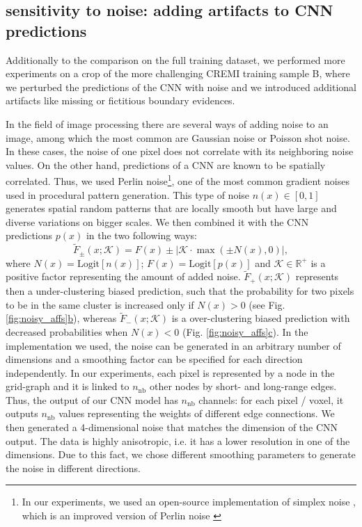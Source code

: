 \subsection{\algname{} sensitivity to noise: adding artifacts to CNN predictions} \label{sec:appendix_noise_gen}
Additionally to the comparison on the full training dataset, we performed more experiments on a crop of the more challenging CREMI training sample B, where we perturbed the predictions of the CNN with noise and we introduced additional artifacts like missing or fictitious boundary evidences.

In the field of image processing there are several ways of adding noise to an image, among which the most common are Gaussian noise or Poisson shot noise. 
In these cases, the noise of one pixel does not correlate with its neighboring noise values. On the other hand, predictions of a CNN are known to be spatially correlated. 
Thus, we used Perlin noise\footnote{In our experiments, we used an open-source implementation of simplex noise \cite{perlin2001noise}, which is an improved version of Perlin noise \cite{perlin1985image}}, one of the most common gradient noises used in procedural pattern generation. This type of noise $n(x)\in[0,1]$ generates spatial random patterns that are locally smooth but have large and diverse variations on bigger scales. We then combined it with the CNN predictions $p(x)$ in the two following ways: 
\begin{equation}\label{eq:noise_biased_predictions}
\tilde{F}_{\pm}(x;\mathcal{K})=F(x)\pm\big|\mathcal{K}\cdot\max\left(\pm N(x),0\right)\big|,
\end{equation}
where  $N(x)=\mathrm{Logit}[n(x)]$; $F(x)=\mathrm{Logit}[p(x)]$ and $\mathcal{K}\in \mathbb{R}^+$ is a positive factor representing the amount of added noise. $\tilde{F}_{+}(x;\mathcal{K})$ represents then a under-clustering biased prediction, such that the probability for two pixels to be in the same cluster is increased only if $N(x)>0$ (see Fig. \hyperref[fig:noisy_affs]{\ref*{fig:noisy_affs}b}), whereas $\tilde{F}_{-}(x;\mathcal{K})$ is a over-clustering biased prediction with decreased probabilities when $N(x)<0$ (Fig. \hyperref[fig:noisy_affs]{\ref*{fig:noisy_affs}c}).
In the implementation we used, the noise can be generated in an arbitrary number of dimensions and a smoothing factor can be specified for each direction independently. In our experiments, each pixel is represented by a node in the grid-graph and it is linked to $n_{\mathrm{nb}}$ other nodes by short- and long-range edges. Thus, the output of our CNN model has $n_{\mathrm{nb}}$ channels: for each pixel / voxel, it outputs $n_{\mathrm{nb}}$ values representing the weights of different edge connections. We then generated a 4-dimensional noise that matches the dimension of the CNN output. The data is highly anisotropic, i.e. it has a lower resolution in one of the dimensions. Due to this fact, we chose different smoothing parameters to generate the noise in different directions. 

